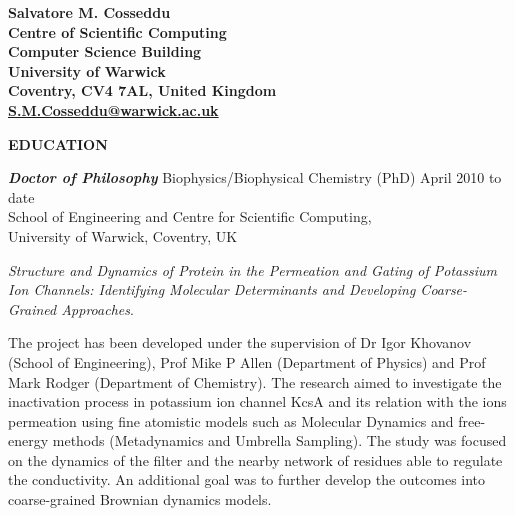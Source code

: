 \documentclass[a4paper,10pt,final]{memoir}
\newcommand{\Sep}{\vspace{1.5em}}
\newcommand{\SmallSep}{\vspace{0.5em}}
\newcommand{\CVSection}[1]
	{\Large\textbf{#1}\par
	\SmallSep\normalsize\normalfont}
\newcommand{\CVItem}[2]
	{\textit{\textbf{\color{RoyalBlue} #1}} #2}
\begin{document}
\Huge\bfseries {\color{RoyalBlue} Salvatore M. Cosseddu} \\
\small
Centre of Scientific Computing \\
Computer Science Building \\
University of Warwick \\
Coventry, CV4 7AL, United Kingdom \\
\url{S.M.Cosseddu@warwick.ac.uk}
\normalsize\normalfont
\SmallSep
\Sep

\CVSection{EDUCATION}
\CVItem{ Doctor of Philosophy}{Biophysics/Biophysical Chemistry (PhD) \hfill April 2010 to date} \\
School of Engineering and Centre for Scientific Computing, \\
University of Warwick, Coventry, UK %
\begin{description} [style=multiline,leftmargin=3cm,font=\normalfont] \itemsep -2pt
\item [Thesis:] \textit{Structure and Dynamics of Protein in the Permeation and Gating of
  Potassium Ion Channels: Identifying Molecular Determinants and Developing Coarse-Grained
  Approaches}.
\item [Research description:] The project has been developed under the supervision of Dr
  Igor Khovanov (School of Engineering), Prof Mike P Allen (Department of Physics) and
  Prof Mark Rodger (Department of Chemistry). The research aimed to investigate the
  inactivation process in potassium ion channel KcsA and its relation with the ions
  permeation using fine atomistic models such as Molecular Dynamics and free-energy
  methods (Metadynamics and Umbrella Sampling). The study was focused on the dynamics of
  the filter and the nearby network of residues able to regulate the conductivity. An
  additional goal was to further develop the outcomes into coarse-grained Brownian dynamics
  models. 
\end{description}
\SmallSep
\end{document}
